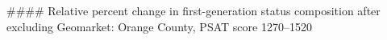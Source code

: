 #### Relative percent change in first-generation status composition after excluding Geomarket: Orange County, PSAT score 1270–1520
